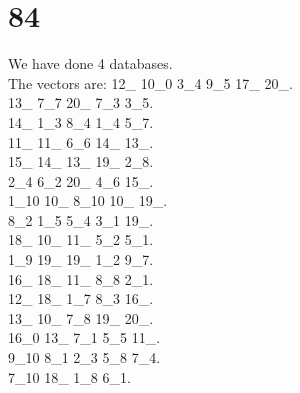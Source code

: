 \chapter{84}
\indent We have done 4 databases.\\
The vectors are:
12\_ 10\_0 3\_4 9\_5 17\_ 20\_.\\13\_ 7\_7 20\_ 7\_3 3\_5.\\14\_ 1\_3 8\_4 1\_4 5\_7.\\11\_ 11\_ 6\_6 14\_ 13\_.\\15\_ 14\_ 13\_ 19\_ 2\_8.\\2\_4 6\_2 20\_ 4\_6 15\_.\\1\_10 10\_ 8\_10 10\_ 19\_.\\8\_2 1\_5 5\_4 3\_1 19\_.\\18\_ 10\_ 11\_ 5\_2 5\_1.\\1\_9 19\_ 19\_ 1\_2 9\_7.\\16\_ 18\_ 11\_ 8\_8 2\_1.\\12\_ 18\_ 1\_7 8\_3 16\_.\\13\_ 10\_ 7\_8 19\_ 20\_.\\16\_0 13\_ 7\_1 5\_5 11\_.\\9\_10 8\_1 2\_3 5\_8 7\_4.\\7\_10 18\_ 1\_8 6\_1.\\